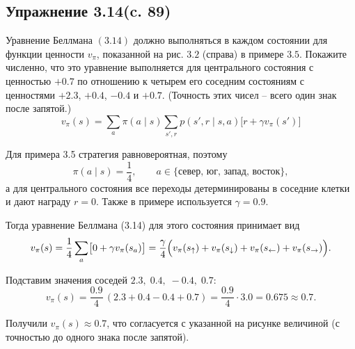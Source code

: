 \subsection{Упражнение 3.14(c. 89)}
Уравнение Беллмана $(3.14)$ должно выполняться в  каждом состоянии для функции ценности $v_{\pi}$, показанной на рис. $3.2$ (справа) в примере  $3.5$. Покажите численно, что это уравнение выполняется для центрального состояния с ценностью $+0.7$ по отношению к четырем его соседним состояниям
с ценностями $+2.3$, $+0.4$, $-0.4$ и $+0.7$. (Точность этих чисел – всего один знак после запятой.)
\begin{equation}
    v_\pi(s)
    =
    \sum_{a} \pi(a \mid s)
    \sum_{s',r} p(s', r \mid s, a)
    \bigl[ r + \gamma v_\pi(s') \bigr]
\tag{3.14}
\end{equation}
\begin{solution}
    Для примера 3.5 стратегия равновероятная, поэтому
    \[
    \pi(a\mid s)=\frac14,\qquad a\in\{\text{север, юг, запад, восток}\},
    \]
    а для центрального состояния все переходы детерминированы в соседние клетки и дают награду \(r=0\).
    Также в примере используется \(\gamma=0.9\).
    
    Тогда уравнение Беллмана (3.14) для этого состояния принимает вид
    \[
    v_\pi(s)=\frac14 \sum_{a}\bigl[0+\gamma v_\pi(s_a)\bigr]
    =\frac{\gamma}{4}\Bigl(v_\pi(s_{\uparrow})+v_\pi(s_{\downarrow})+v_\pi(s_{\leftarrow})+v_\pi(s_{\rightarrow})\Bigr).
    \]
    
    Подставим значения соседей \(2.3,\;0.4,\;-0.4,\;0.7\):
    \[
    v_\pi(s)=\frac{0.9}{4}\,(2.3+0.4-0.4+0.7)
    =\frac{0.9}{4}\cdot 3.0
    =0.675 \approx 0.7.
    \]
    
    Получили \(v_\pi(s)\approx 0.7\), что согласуется с указанной на рисунке величиной (с точностью до одного знака после запятой).
\end{solution}

